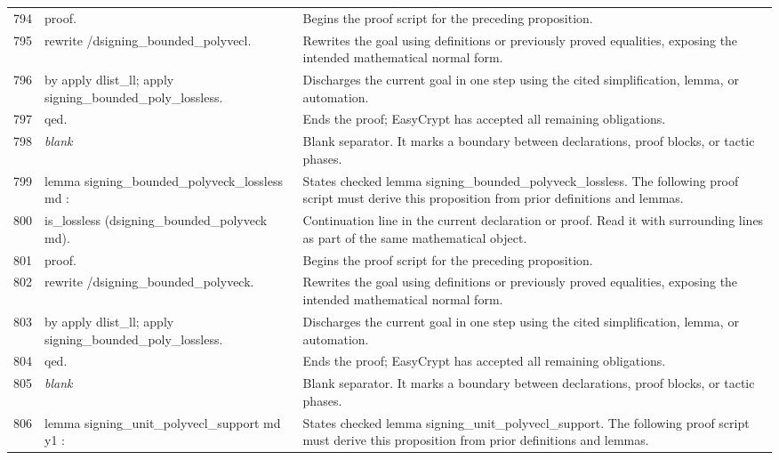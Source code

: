 \documentclass[10pt]{article}
\begin{document}
\begin{longtable}{r L{0.53\textwidth} L{0.37\textwidth}}
794 & {\ttfamily\scriptsize proof.} & Begins the proof script for the preceding proposition. \\
795 & {\ttfamily\scriptsize rewrite /dsigning\_bounded\_polyvecl.} & Rewrites the goal using definitions or previously proved equalities, exposing the intended mathematical normal form. \\
796 & {\ttfamily\scriptsize by apply dlist\_ll; apply signing\_bounded\_poly\_lossless.} & Discharges the current goal in one step using the cited simplification, lemma, or automation. \\
797 & {\ttfamily\scriptsize qed.} & Ends the proof; EasyCrypt has accepted all remaining obligations. \\
798 & {\ttfamily\scriptsize \emph{blank}} & Blank separator.  It marks a boundary between declarations, proof blocks, or tactic phases. \\
799 & {\ttfamily\scriptsize lemma signing\_bounded\_polyveck\_lossless md :} & States checked lemma signing\_bounded\_polyveck\_lossless.  The following proof script must derive this proposition from prior definitions and lemmas. \\
800 & {\ttfamily\scriptsize   is\_lossless (dsigning\_bounded\_polyveck md).} & Continuation line in the current declaration or proof.  Read it with surrounding lines as part of the same mathematical object. \\
801 & {\ttfamily\scriptsize proof.} & Begins the proof script for the preceding proposition. \\
802 & {\ttfamily\scriptsize rewrite /dsigning\_bounded\_polyveck.} & Rewrites the goal using definitions or previously proved equalities, exposing the intended mathematical normal form. \\
803 & {\ttfamily\scriptsize by apply dlist\_ll; apply signing\_bounded\_poly\_lossless.} & Discharges the current goal in one step using the cited simplification, lemma, or automation. \\
804 & {\ttfamily\scriptsize qed.} & Ends the proof; EasyCrypt has accepted all remaining obligations. \\
805 & {\ttfamily\scriptsize \emph{blank}} & Blank separator.  It marks a boundary between declarations, proof blocks, or tactic phases. \\
806 & {\ttfamily\scriptsize lemma signing\_unit\_polyvecl\_support md y1 :} & States checked lemma signing\_unit\_polyvecl\_support.  The following proof script must derive this proposition from prior definitions and lemmas. \\

\end{longtable}
\end{document}
